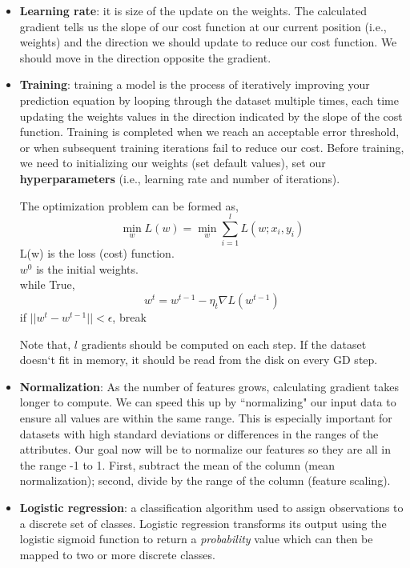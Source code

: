 \documentclass[]{article}
\begin{document}
\begin{itemize}
\begin{itemize}
		\item \textbf{Learning rate}: it is size of the update on the weights. The calculated gradient tells us the slope of our cost function at our current position (i.e., weights) and the direction we should update to reduce our cost function. We should move in the direction opposite the gradient.
		
		\item \textbf{Training}: training a model is the process of iteratively improving your prediction equation by looping through the dataset multiple times, each time updating the weights values in the direction indicated by the slope of the cost function. Training is completed when we reach an acceptable error threshold, or when subsequent training iterations fail to reduce our cost. Before training, we need to initializing our weights (set default values), set our \textbf{hyperparameters} (i.e., learning rate and number of iterations).
		
		The optimization problem can be formed as,
		\begin{equation}
		\min_{w}L(w)=\min_{w}{\sum_{i=1}^{l}L(w;x_i,y_i)}
		\end{equation}
		L(w) is the loss (cost) function.\\
		$w^0$ is the initial weights.\\
		while True,
		\begin{equation}
		w^t=w^{t-1}-\eta_t\nabla{L(w^{t-1})}
		\end{equation}
		if $||w^t-w^{t-1}||<\epsilon$, break
		
		Note that, $l$ gradients should be computed on each step. If the dataset doesn`t fit in memory, it should be read from the disk on every GD step.
		
		\item \textbf{Normalization}: As the number of features grows, calculating gradient takes longer to compute. We can speed this up by ``normalizing" our input data to ensure all values are within the same range. This is especially important for datasets with high standard deviations or differences in the ranges of the attributes. Our goal now will be to normalize our features so they are all in the range -1 to 1.
		First, subtract the mean of the column (mean normalization); second, divide by the range of the column (feature scaling).
		
		\item \textbf{Logistic regression}: a classification algorithm used to assign observations to a discrete set of classes. Logistic regression transforms its output using the logistic sigmoid function to return a \textit{probability} value which can then be mapped to two or more discrete classes.
		

\end{itemize}
\end{itemize}
\end{document}
